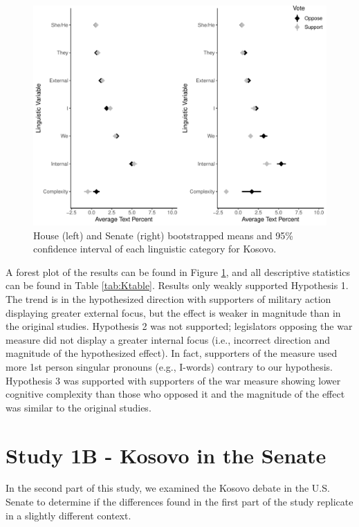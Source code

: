\documentclass[
  english,
  ,man,floatsintext]{apa6}
\begin{document}
\begin{figure}
\centering
\includegraphics{Language-of-War-Markdown_KJ2_files/figure-latex/Kpic-1.pdf}
\caption{\label{fig:Kpic}House (left) and Senate (right) bootstrapped means and 95\% confidence interval of each linguistic category for Kosovo.}
\end{figure}

A forest plot of the results can be found in Figure \ref{fig:Kpic}, and all descriptive statistics can be found in Table \ref{tab:Ktable}. Results only weakly supported Hypothesis 1. The trend is in the hypothesized direction with supporters of military action displaying greater external focus, but the effect is weaker in magnitude than in the original studies. Hypothesis 2 was not supported; legislators opposing the war measure did not display a greater internal focus (i.e., incorrect direction and magnitude of the hypothesized effect). In fact, supporters of the measure used more 1st person singular pronouns (e.g., I-words) contrary to our hypothesis. Hypothesis 3 was supported with supporters of the war measure showing lower cognitive complexity than those who opposed it and the magnitude of the effect was similar to the original studies.

\hypertarget{study-1b---kosovo-in-the-senate}{%
\section{Study 1B - Kosovo in the Senate}\label{study-1b---kosovo-in-the-senate}}

In the second part of this study, we examined the Kosovo debate in the U.S. Senate to determine if the differences found in the first part of the study replicate in a slightly different context.
\end{document}
